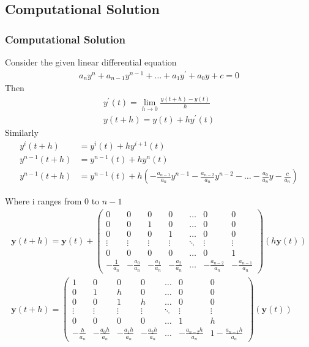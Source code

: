 \documentclass{beamer}
\providecommand{\brak}[1]{\ensuremath{\left(#1\right)}}
\theoremstyle{remark}
\newcommand{\myvec}[1]{\ensuremath{\begin{pmatrix}#1\end{pmatrix}}}
\let\vec\mathbf
\numberwithin{equation}{section}
\begin{document}
\subsection{Computational Solution}
\begin{frame}
\frametitle{Computational Solution}
Consider the given linear differential equation
\begin{align}
	a_{n}y^n + a_{n-1}y^{n-1} + \dots + a_{1}y^\prime + a_{0}y + c = 0
\end{align}
Then
\begin{align}
	y^{\prime}\brak{t} = \lim_{h\to 0}\frac{y\brak{t+h} - y\brak{t}}{h}\\
	y\brak{t+h} = y\brak{t} + hy^{\prime}\brak{t}
\end{align}
Similarly
\begin{align}
	y^{i}\brak{t+h} &= y^{i}\brak{t} + hy^{i+1}\brak{t}\\
	y^{n-1}\brak{t+h} &= y^{n-1}\brak{t} + hy^{n}\brak{t}\\
	y^{n-1}\brak{t+h} &= y^{n-1}\brak{t} + h\brak{-\frac{a_{n-1}}{a_n}y^{n-1}-\frac{a_{n-2}}{a_n}y^{n-2} - \dots -\frac{a_{0}}{a_n}y - \frac{c}{a_n}}
\end{align}
\end{frame}
\begin{frame}
Where i ranges from 0 to $n-1$\\
\begin{align}
	\vec{y}\brak{t+h} = \vec{y}\brak{t} + \myvec{0 & 0 & 0 & 0 & \dots & 0 & 0\\ 0 & 0 & 1 & 0 & \dots & 0 & 0\\0 & 0 & 0 & 1 & \dots & 0 & 0\\\vdots & \vdots & \vdots & \vdots& \ddots & \vdots & \vdots\\
	0 & 0 & 0 & 0 & \dots & 0 & 1\\-\frac{1}{a_n} & -\frac{a_0}{a_n} & -\frac{a_1}{a_n} & -\frac{a_2}{a_n} & \dots & -\frac{a_{n-2}}{a_n} & -\frac{a_{n-1}}{a_n}}\brak{h\vec{y}\brak{t}}\\
	\vec{y}\brak{t+h} = \myvec{1 & 0 & 0 & 0 & \dots & 0 & 0\\ 0 & 1 & h & 0 & \dots & 0 & 0\\0 & 0 & 1 & h & \dots & 0 & 0\\\vdots & \vdots & \vdots & \vdots& \ddots & \vdots & \vdots\\
	0 & 0 & 0 & 0 & \dots & 1 & h\\-\frac{h}{a_n} & -\frac{a_0h}{a_n} & -\frac{a_1h}{a_n} & -\frac{a_2h}{a_n} & \dots & -\frac{a_{n-2}h}{a_n} & 1-\frac{a_{n-1}h}{a_n}}\brak{\vec{y}\brak{t}}
\end{align}
\end{frame}
\end{document}
